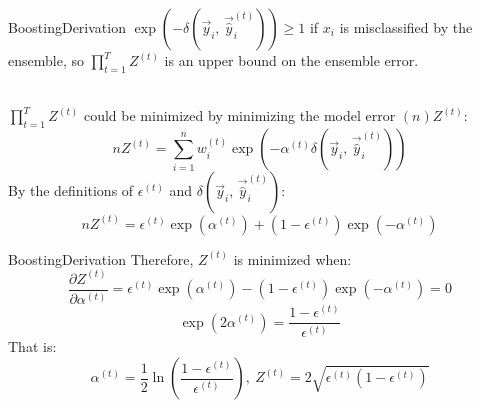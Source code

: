 \documentclass[10pt]{beamer}
\begin{document}
\begin{frame}{Boosting}{Derivation}
  $\exp(-\delta(\vec{y}_i,\,\vec{\hat{y}}_i^{(t)})) \geq 1$ if $x_i$ is
  misclassified by the ensemble, so $\prod_{t=1}^{T}
    Z^{(t)}$ is an upper bound on the ensemble error.
  \\~\

  $\prod_{t=1}^{T} Z^{(t)}$ could be minimized by minimizing the model error
  $(n)$$Z^{(t)}$:
    \begin{equation*}
      n Z^{(t)}
      =
      \sum_{i = 1}^{n}
      w^{(t)}_i
      \exp(-\alpha^{(t)}\delta(\vec{y}_i,\,\vec{\hat{y}}_i^{(t)}))
    \end{equation*}
    By the definitions of $\epsilon^{(t)}$ and
  $\delta(\vec{y}_i,\,\vec{\hat{y}}_i^{(t)})$:
  \begin{equation*}
    n Z^{(t)}
    =
    \epsilon^{(t)} \exp(\alpha^{(t)})
    +
    (1 - \epsilon^{(t)}) \exp(-\alpha^{(t)})
  \end{equation*}
\end{frame}

\begin{frame}{Boosting}{Derivation}
  Therefore, $Z^{(t)}$ is minimized when:
  \begin{equation*}
    \frac{\partial Z^{(t)}}{\partial \alpha^{(t)}}
    =
    \epsilon^{(t)} \exp(\alpha^{(t)})
    -
    (1 - \epsilon^{(t)}) \exp(-\alpha^{(t)})
    =
    0
  \end{equation*}
  \begin{equation*}
    \exp(2\alpha^{(t)})
    =
    \frac{1 - \epsilon^{(t)}}{\epsilon^{(t)}}
  \end{equation*}
  That is:
  \begin{equation*}
    \alpha^{(t)}
    =
    \frac{1}{2}\ln\left(\frac{1 - \epsilon^{(t)}}{\epsilon^{(t)}}\right)
    ,\
    Z^{(t)}
    =
    2\sqrt{\epsilon^{(t)}(1 - \epsilon^{(t)})}
  \end{equation*}
\end{frame}
\end{document}
